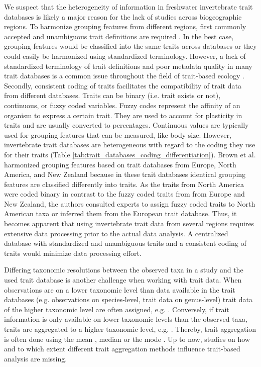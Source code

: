 \documentclass{article}
\begin{document}
We suspect that the heterogeneity of information in freshwater invertebrate trait databases is likely a major reason for the lack of studies across biogeographic regions. To harmonize grouping features from different regions, first commonly accepted and unambiguous trait definitions are required \cite{schneider_towards_2019}. In the best case, grouping features would be classified into the same traits across databases or they could easily be harmonized using standardized terminology. However, a lack of standardized terminology of trait definitions and poor metadata quality in many trait databases is a common issue throughout the field of trait-based ecology \cite{baird_toward_2011, schneider_towards_2019}. Secondly, consistent coding of traits facilitates the compatibility of trait data from different databases. Traits can be binary (i.e. trait exists or not), continuous, or fuzzy coded variables. Fuzzy codes represent the affinity of an organism to express a certain trait. They are used to account for plasticity in traits and are usually converted to percentages. Continuous values are typically used for grouping features that can be measured, like body size. However, invertebrate trait databases are heterogeneous with regard to the coding they use for their traits \cite{culp_incorporating_2011} (Table \ref{tab:trait_databases_coding_differentiation}). Brown et al. \cite{brown_functional_2018} harmonized grouping features based on trait databases from Europe, North America, and New Zealand because in these trait databases identical grouping features are classified differently into traits. As the traits from North America were coded binary in contrast to the fuzzy coded traits from from Europe and New Zealand, the authors consulted experts to assign fuzzy coded traits to North American taxa or inferred them from the European trait database. Thus, it becomes apparent that using invertebrate trait data from several regions requires extensive data processing prior to the actual data analysis. A centralized database with standardized and unambiguous traits and a consistent coding of traits would minimize data processing effort.

Differing taxonomic resolutions between the observed taxa in a study and the used trait database is another challenge when working with trait data. When observations are on a lower taxonomic level than data available in the trait databases (e.g. observations on species-level, trait data on genus-level) trait data of the higher taxonomic level are often assigned, e.g. \cite{szocs_effects_2014, vos_taxonomic_2017}. Conversely, if trait information is only available on lower taxonomic levels than the observed taxa, traits are aggregated to a higher taxonomic level, e.g. \cite{poff_functional_2006, szocs_effects_2014, piliere_a._f._h._importance_2016, aspin_extreme_2019}. Thereby, trait aggregation is often done using the mean \cite{magliozzi_functional_2019}, median \cite{szocs_effects_2014} or the mode \cite{piliere_a._f._h._importance_2016}. Up to now, studies on how and to which extent different trait aggregation methods influence trait-based analysis are missing.
\end{document}
